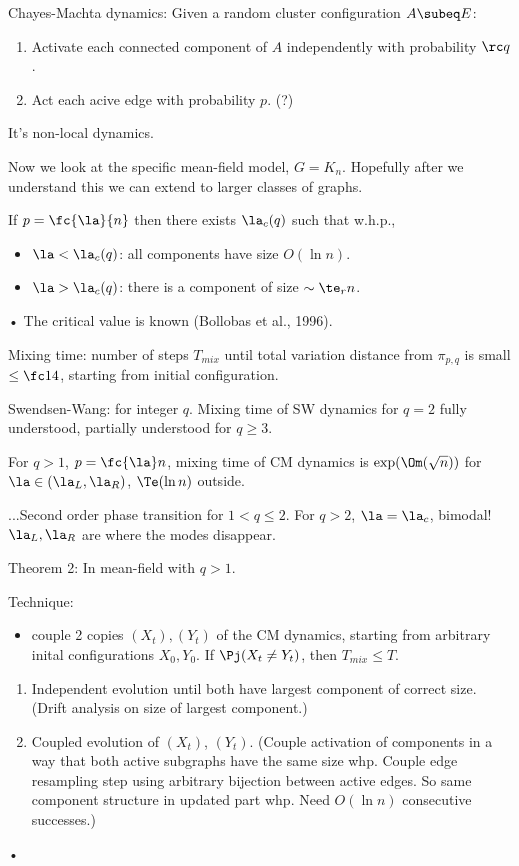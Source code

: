 
Chayes-Machta dynamics: Given a random cluster configuration $A\subeq E$:
\begin{enumerate}
\item
Activate each connected component of $A$ independently with probability $\rc q$. 
\item
Act each acive edge with probability $p$. (?)
\end{enumerate}
It's non-local dynamics.

Now we look at the specific mean-field model, $G=K_n$. Hopefully after we understand this we can extend to larger classes of graphs.

If $p=\fc{\la}{n}$ then there exists $\la_c(q)$ such that w.h.p., 
\begin{itemize}
\item
$\la<\la_c(q)$: all components have size $O(\ln n)$.
\item
$\la >\la_c(q)$: there is a component of size $\sim \te_rn$.
\end{itemize}•
The critical value is known (Bollobas et al., 1996).

Mixing time: number of steps $T_{mix}$ until total variation distance from $\pi_{p,q}$ is small $\le \fc14$, starting from initial configuration.

Swendsen-Wang: for integer $q$. Mixing time of SW dynamics for $q=2$ fully understood, partially understood for $q\ge 3$.

\begin{thm}
For $q>1$, $p=\fc{\la}n$, mixing time of CM dynamics is $\exp(\Om(\sqrt n))$ for $\la\in (\la_L,\la_R)$, $\Te(\ln n)$ outside.
\end{thm}
...Second order phase transition for $1<q\le 2$.
For $q>2$, $\la=\la_c$, bimodal!
$\la_L,\la_R$ are where the modes disappear. 

Theorem 2: In mean-field with $q>1$. %

Technique:
\begin{itemize}
\item
couple 2 copies $(X_t), (Y_t)$ of the CM dynamics, starting from arbitrary inital configurations $X_0,Y_0$. 
If $\Pj(X_t\ne Y_t)$, then $T_{mix}\le T$.
\end{itemize}
\begin{enumerate}
\item
Independent evolution until both have largest component of correct size. (Drift analysis on size of largest component.)
\item
Coupled evolution of $(X_t)$, $(Y_t)$.
(Couple activation of components in a way that both active subgraphs have the same size whp. Couple edge resampling step using arbitrary bijection between active edges. So same component structure in updated part whp. Need $O(\ln n)$ consecutive successes.)
\end{enumerate}•

